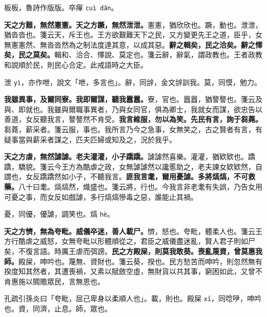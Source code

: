 \begin{quoting}板板，魯詩作版版。卒癉 \texttt{cuì dǎn}。\end{quoting}

\textbf{天之方難，無然憲憲。天之方蹶，無然泄泄。}{\footnotesize 憲憲，猶欣欣也。蹶，動也。泄泄，猶沓沓也。箋云天，斥王也。王方欲艱難天下之民，又方變更先王之道，臣乎，女無憲憲然、無沓沓然為之制法度達其意，以成其惡。}\textbf{辭之輯矣，民之洽矣。辭之懌矣，民之莫矣。}{\footnotesize 輯和、洽合、懌說、莫定也。箋云辭，辭氣，謂政教也。王者政教和說順於民，則民心合定。此戒語時之大臣。}

\begin{quoting}泄 \texttt{yì}，亦作呭，說文「呭，多言也」。辭，同辝，金文辝訓我。莫，同慔，勉力。\end{quoting}

\textbf{我雖異事，及爾同寮。我即爾謀，聽我囂囂。}{\footnotesize 寮，官也。囂囂，猶謷謷也。箋云及與、即就也。我雖與爾職事異者，乃與女同官，俱為卿士，我就女而謀，欲忠告以善道，女反聽我言，謷謷然不肯受。}\textbf{我言維服，勿以為笑。先民有言，詢于芻蕘。}{\footnotesize 芻蕘，薪采者。箋云服，事也。我所言乃今之急事，女無笑之，古之賢者有言，有疑事當與薪采者謀之，匹夫匹婦或知及之，況於我乎。}

\textbf{天之方虐，無然謔謔。老夫灌灌，小子蹻蹻。}{\footnotesize 謔謔然喜樂。灌灌，猶欵欵也。蹻蹻，驕貌。箋云今王方為酷虐之政，女無謔謔然以讒慝助之，老夫諫女欵欵然，自謂也，女反蹻蹻然如小子，不聽我言。}\textbf{匪我言耄，爾用憂謔。多將熇熇，不可救藥。}{\footnotesize 八十曰耄。熇熇然，熾盛也。箋云將，行也。今我言非老耄有失誤，乃告女用可憂之事，而女反如戲謔，多行熇熇慘毒之惡，誰能止其禍。}

\begin{quoting}憂，同優，優謔，調笑也。熇 \texttt{hè}。\end{quoting}

\textbf{天之方懠，無為夸毗。威儀卒迷，善人載尸。}{\footnotesize 懠，怒也。夸毗，體柔人也。箋云王方行酷虐之威怒，女無夸毗以形體順從之，君臣之威儀盡迷亂，賢人君子則如尸矣，不復言語。時厲王虐而弭謗。}\textbf{民之方殿屎，則莫我敢葵。喪亂蔑資，曾莫惠我師。}{\footnotesize 殿屎，呻吟也。蔑無、資財也。箋云葵，揆也。民方愁苦而呻吟，則忽然無有揆度知其然者，其遭喪禍，又素以賦斂空虛，無財貨以共其事，窮困如此，又曾不肯惠施以賙贍眾民，言無恩也。}

\begin{quoting}孔疏引孫炎曰「夸毗，屈己卑身以柔順人也」。載，則也。殿屎 \texttt{xī}，同唸吚，呻吟也。資，同濟，止息。師，眾也。\end{quoting}

